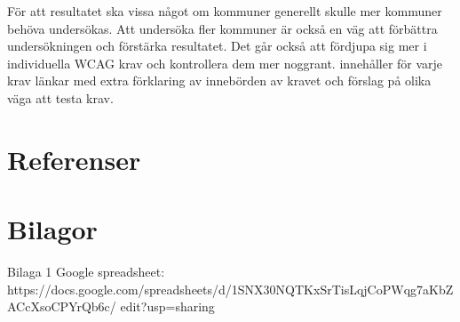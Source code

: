 \documentclass[11p]{article}
\begin{document}
    För att resultatet ska vissa något om kommuner generellt skulle mer kommuner behöva undersökas.
    Att undersöka fler kommuner är också en väg att förbättra undersökningen och förstärka resultatet.
    Det går också att fördjupa sig mer i individuella WCAG krav och kontrollera dem mer noggrant.
    \textcite{WCAG_2.2} innehåller för varje krav länkar med extra förklaring av innebörden av kravet och förslag på olika väga att testa krav.

    \section{Referenser}

    \printbibliography

    \section{Bilagor}
    Bilaga 1
    Google spreadsheet:
    \\ https://docs.google.com/spreadsheets/d/1SNX30NQTKxSrTisLqjCoPWqg7aKbZACcXsoCPYrQb6c/
    edit?usp=sharing
\end{document}
